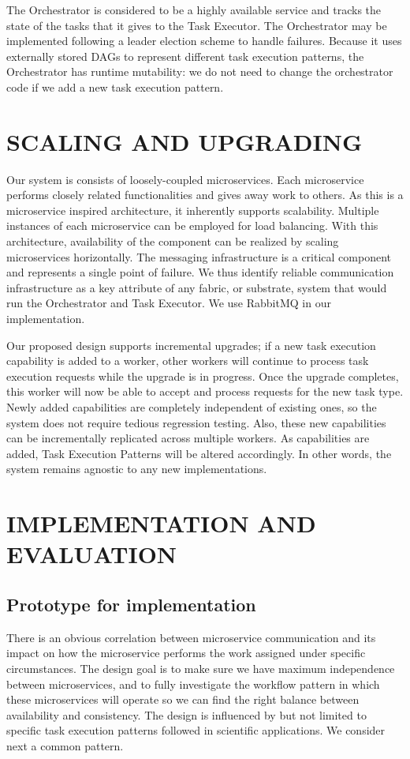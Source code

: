 \documentclass[review]{elsarticle}
\begin{document}
The Orchestrator is considered to be a highly available service and tracks the state of the tasks that it gives to the Task Executor.  The Orchestrator may be implemented following a leader election scheme to handle failures.  Because it uses externally stored DAGs to represent different task execution patterns, the Orchestrator has runtime mutability: we do not need to change the orchestrator code if we add a new task execution pattern. 

\section{SCALING AND UPGRADING}

Our system is consists of loosely-coupled microservices. Each microservice performs closely related functionalities and gives away work to others. As this is a microservice inspired architecture, it inherently supports scalability. Multiple instances of each microservice can be employed for load balancing. With this architecture, availability of the component can be realized by scaling microservices horizontally. The messaging infrastructure is a critical component and represents a single point of failure. We thus identify reliable communication infrastructure as a key attribute of any fabric, or substrate, system that would run the Orchestrator and Task Executor. We use RabbitMQ in our implementation. 

Our proposed design supports incremental upgrades; if a new task execution capability is added to a worker, other workers will continue to process task execution requests while the upgrade is in progress. Once the upgrade completes, this worker will now be able to accept and process requests for the new task type. Newly added capabilities are completely independent of existing ones, so the system does not require tedious regression testing. Also, these new capabilities can be incrementally replicated across multiple workers. As capabilities are added, Task Execution Patterns will be altered accordingly.  In other words, the system remains agnostic to any new implementations.

\section{IMPLEMENTATION AND EVALUATION}

\subsection{Prototype for implementation}
There is an obvious correlation between microservice communication and its impact on how the microservice performs the work assigned under specific circumstances. The design goal is to make sure we have maximum independence between microservices, and to fully investigate the workflow pattern in which these microservices will operate so we can find the right balance between availability and consistency.
The design is influenced by but not limited to specific task execution patterns followed in scientific applications.   We consider next a common pattern. 
\end{document}
